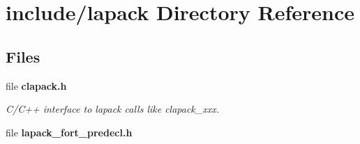 \section{include/lapack Directory Reference}
\label{dir_987b24a74bfaaa130c1320e54ca930b0}
\subsection*{Files}
\begin{DoxyCompactItemize}
\item 
file {\bf clapack.\-h}
\begin{DoxyCompactList}\small\item\em C/\-C++ interface to lapack calls like clapack\-\_\-xxx. \end{DoxyCompactList}\item 
file {\bf lapack\-\_\-fort\-\_\-predecl.\-h}
\end{DoxyCompactItemize}

